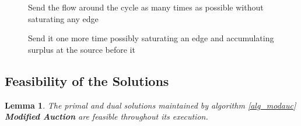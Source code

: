 \documentclass[11pt]{article}
\newtheorem{lemma}{Lemma}[section]
\newcounter{rem}
\begin{document}
\begin{figure}[h]
\centerline{\epsfysize=190pt}
\caption{Send the flow around the cycle as many times as possible without
saturating any edge}
\label{fig_cyclepush3}
\end{figure}


\begin{figure}[h]
\centerline{\epsfysize=190pt}
\caption{Send it one more time possibly saturating an edge and accumulating
surplus at the source before it}
\label{fig_cyclepush4}
\end{figure}





\subsection{Feasibility of the Solutions}

\begin{lemma}
The primal and dual solutions maintained by algorithm \ref{alg_modauc} {\bf Modified Auction}
are feasible throughout its execution.
\label{lemma_BTSfeasible}
\end{lemma}
\end{document}
